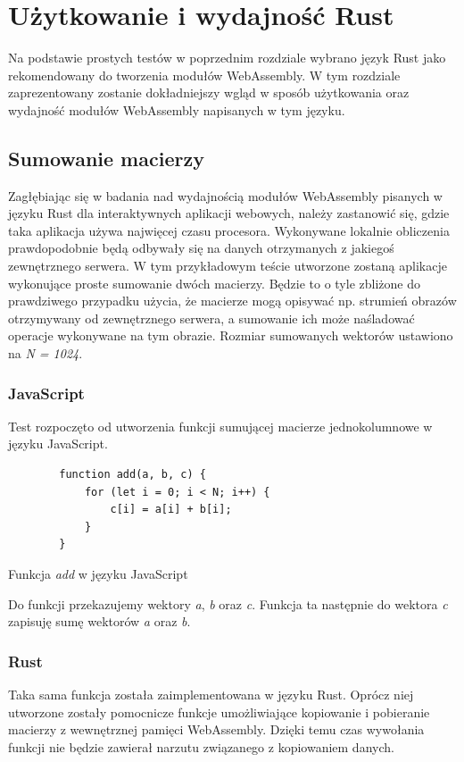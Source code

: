 \documentclass[language=polish,type=master]{aghmodern}
\begin{document}
\chapter{Użytkowanie i wydajność Rust}
Na podstawie prostych testów w poprzednim rozdziale wybrano język Rust jako rekomendowany do tworzenia modułów WebAssembly.
W tym rozdziale zaprezentowany zostanie dokładniejszy wgląd w sposób użytkowania oraz wydajność modułów WebAssembly napisanych w tym języku.

\section{Sumowanie macierzy}
Zagłębiając się w badania nad wydajnością modułów WebAssembly pisanych w języku Rust dla interaktywnych aplikacji webowych, należy zastanowić się, gdzie taka aplikacja używa najwięcej czasu procesora.
Wykonywane lokalnie obliczenia prawdopodobnie będą odbywały się na danych otrzymanych z jakiegoś zewnętrznego serwera.
W tym przykładowym teście utworzone zostaną aplikacje wykonujące proste sumowanie dwóch macierzy.
Będzie to o tyle zbliżone do prawdziwego przypadku użycia, że macierze mogą opisywać np. strumień obrazów otrzymywany od zewnętrznego serwera, a sumowanie ich może naśladować operacje wykonywane na tym obrazie.
Rozmiar sumowanych wektorów ustawiono na \emph{N = 1024}.

\subsection{JavaScript}
Test rozpoczęto od utworzenia funkcji sumującej macierze jednokolumnowe w języku JavaScript.

\begin{listing}[H]
    \begin{verbatim}
        function add(a, b, c) {
            for (let i = 0; i < N; i++) {
                c[i] = a[i] + b[i];
            }
        }
    \end{verbatim}
    \caption{Funkcja \emph{add} w języku JavaScript}
\end{listing}

Do funkcji przekazujemy wektory \emph{a}, \emph{b} oraz \emph{c}.
Funkcja ta następnie do wektora \emph{c} zapisuję sumę wektorów \emph{a} oraz \emph{b}.

\subsection{Rust}
Taka sama funkcja została zaimplementowana w języku Rust.
Oprócz niej utworzone zostały pomocnicze funkcje umożliwiające kopiowanie i pobieranie macierzy z wewnętrznej pamięci WebAssembly.
Dzięki temu czas wywołania funkcji nie będzie zawierał narzutu związanego z kopiowaniem danych.
\end{document}
